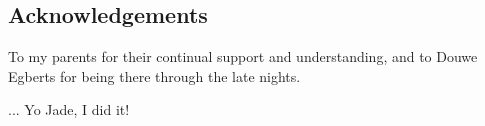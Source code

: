 \subsection*{Acknowledgements}
To my parents for their continual support and understanding, and to Douwe Egberts for being there through the late nights.
 
... Yo Jade, I did it!
\setcounter{page}{1}
\pagestyle{plain}
\clearpage